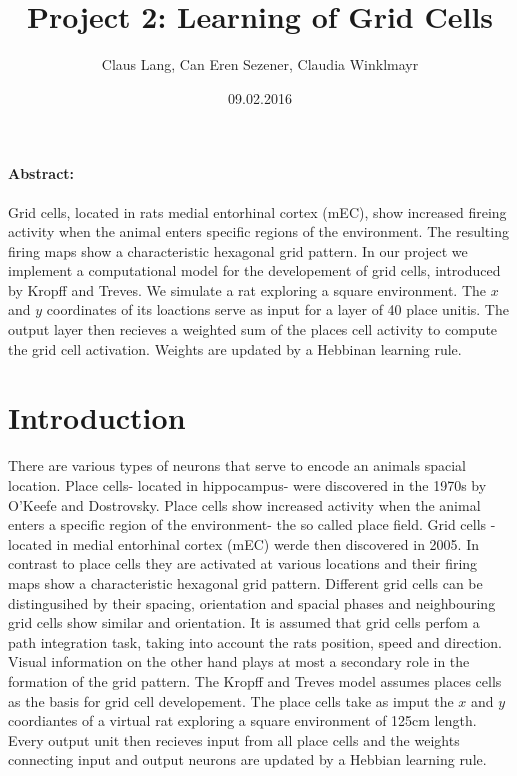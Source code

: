 \documentclass[a4paper, 12pt]{article}
\title{Project 2: Learning of Grid Cells}
\author{Claus Lang, Can Eren Sezener, Claudia Winklmayr}
\date{09.02.2016}
\begin{document}
\maketitle

\paragraph{Abstract:}
Grid cells, located in rats medial entorhinal cortex (mEC), show increased fireing activity when the animal enters specific regions of the environment. The resulting firing maps show a characteristic hexagonal grid pattern. In our project we implement a computational model for the developement of grid cells, introduced by Kropff and Treves. We simulate a rat exploring a square environment. The $x$ and $y$ coordinates of its loactions serve as input for a layer of 40 place unitis. The output layer then recieves a weighted sum of the places cell activity to compute the grid cell activation. Weights are updated by a Hebbinan learning rule. 

\section{Introduction}
There are various types of neurons that serve to encode an animals spacial location. Place cells- located in hippocampus- were discovered in the 1970s by O'Keefe and Dostrovsky. Place cells show increased activity when the animal enters a specific region of the environment- the so called place field.\newline
Grid cells - located in medial entorhinal cortex (mEC) werde then discovered in 2005. In contrast to place cells they are activated at various locations and their firing maps show a characteristic hexagonal grid pattern. Different grid cells can be distingusihed by their spacing, orientation and spacial phases and neighbouring grid cells show similar and orientation. \newline
It is assumed that grid cells perfom a path integration task, taking into account the rats position, speed and direction. Visual information on the other hand plays at most a secondary role in the formation of the grid pattern. \newline
The Kropff and Treves model assumes places cells as the basis for grid cell developement. The place cells take as imput the $x$ and $y$ coordiantes of a virtual rat exploring a square environment of 125cm length. Every output unit then recieves input from all place cells and the weights connecting input and output neurons are updated by a Hebbian learning rule. 
%
%
%
\end{document}
